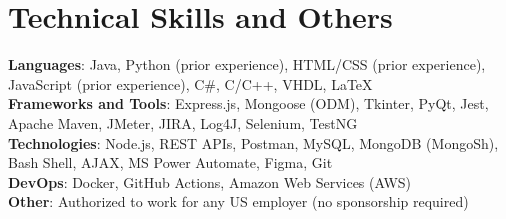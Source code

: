 \section{Technical Skills and Others}
    \begin{itemize}[leftmargin=0.15in, label={}]
	\small{\item{
	\textbf{Languages}{: Java, Python (prior experience), HTML/CSS (prior experience), JavaScript (prior experience), C\#, C/C++, VHDL, LaTeX} \\
		\textbf{Frameworks and Tools}{: Express.js, Mongoose (ODM), Tkinter, PyQt, Jest, Apache Maven, JMeter, JIRA, Log4J, Selenium, TestNG} \\
		\textbf{Technologies}{: Node.js, REST APIs, Postman, MySQL, MongoDB (MongoSh), Bash Shell, AJAX, MS Power Automate, Figma, Git} \\
		\textbf{DevOps}{: Docker, GitHub Actions, Amazon Web Services (AWS)} \\
            \textbf{Other}{: Authorized to work for any US employer (no sponsorship required)}
	}}
    \end{itemize}
